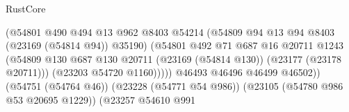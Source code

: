 \begin{lexlean}{RustCore}
\begin{coremodule}
                                                        (@54801
                                                          @490
                                                          @494
                                                          @13
                                                          @962
                                                          @8403
                                                          @54214
                                                          (@54809
                                                            @94
                                                            @13
                                                            @94
                                                            @8403
                                                            (@23169 (@54814 @94))
                                                            @35190)
                                                          (@54801
                                                            @492
                                                            @71
                                                            @687
                                                            @16
                                                            @20711
                                                            @1243
                                                            (@54809
                                                              @130
                                                              @687
                                                              @130
                                                              @20711
                                                              (@23169 (@54814 @130))
                                                              (@23177 (@23178 @20711)))
                                                            (@23203 @54720 @1160)))))
                                                    @46493
                                                    @46496
                                                    @46499
                                                    @46502))
                                                (@54751 (@54764 @46))
                                                (@23228 (@54771 @54 @986))
                                                (@23105 (@54780 @986 @53 @20695 @1229))
                                                (@23257
                                                  @54610
                                                  @991

\end{coremodule}
\end{lexlean}

